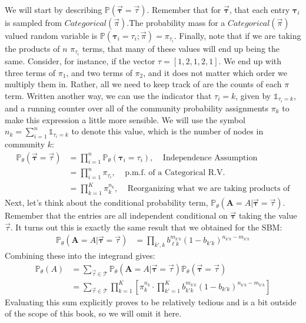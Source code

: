 \documentclass[letterpaper,10pt,english]{jupyterBook}
\begin{document}
\sphinxAtStartPar
We will start by describing \(\mathbb P(\vec{\pmb \tau} = \vec\tau)\). Remember that for \(\vec{\pmb \tau}\), that each entry \(\pmb \tau_i\) is sampled  from \(Categorical(\vec \pi)\).The probability mass for a \(Categorical(\vec \pi)\)\sphinxhyphen{}valued random variable is \(\mathbb P(\pmb \tau_i = \tau_i; \vec \pi) = \pi_{\tau_i}\). Finally, note that if we are taking the products of \(n\) \(\pi_{\tau_i}\) terms, that many of these values will end up being the same. Consider, for instance, if the vector \(\tau = [1,2,1,2,1]\). We end up with three terms of \(\pi_1\), and two terms of \(\pi_2\), and it does not matter which order we multiply them in. Rather, all we need to keep track of are the counts of each \(\pi\) term. Written another way, we can use the indicator that \(\tau_i = k\), given by \(\mathbb 1_{\tau_i = k}\), and a running counter over all of the community probability assignments \(\pi_k\) to make this expression a little more sensible. We will use the symbol \(n_k = \sum_{i = 1}^n \mathbb 1_{\tau_i = k}\) to denote this value, which is the number of nodes in community \(k\):
\begin{align*}
\mathbb P_\theta(\vec{\pmb \tau} = \vec \tau) &= \prod_{i = 1}^n \mathbb P_\theta(\pmb \tau_i = \tau_i),\;\;\;\;\textrm{Independence Assumption} \\
&= \prod_{i = 1}^n \pi_{\tau_i} ,\;\;\;\;\textrm{p.m.f. of a Categorical R.V.}\\
&= \prod_{k = 1}^K \pi_{k}^{n_k},\;\;\;\;\textrm{Reorganizing what we are taking products of}
\end{align*}
\sphinxAtStartPar
Next, let’s think about the conditional probability term, \(\mathbb P_\theta(\mathbf A = A \big | \vec{\pmb \tau} = \vec \tau)\). Remember that the entries are all independent conditional on \(\vec{\pmb \tau}\) taking the value \(\vec\tau\). It turns out this is exactly the same result that we obtained for the  SBM:
\begin{align*}
\mathbb P_\theta(\mathbf A = A \big | \vec{\pmb \tau} = \vec \tau)
&= \prod_{k',k} b_{\ell k}^{m_{k' k}}(1 - b_{k' k})^{n_{k' k} - m_{k' k}}
\end{align*}
\sphinxAtStartPar
Combining these into the integrand gives:
\begin{align*}
\mathbb P_\theta(A) &= \sum_{\vec \tau \in \mathcal T} \mathbb P_\theta(\mathbf A = A \big | \vec{\pmb \tau} = \vec \tau) \mathbb P_\theta(\vec{\pmb \tau} = \vec \tau) \\
&= \sum_{\vec \tau \in \mathcal T} \prod_{k = 1}^K \left[\pi_k^{n_k}\cdot \prod_{k'=1}^K b_{k' k}^{m_{k' k}}(1 - b_{k' k})^{n_{k' k} - m_{k' k}}\right]
\end{align*}
\sphinxAtStartPar
Evaluating this sum explicitly proves to be relatively tedious and is a bit outside of the scope of this book, so we will omit it here.
\end{document}
